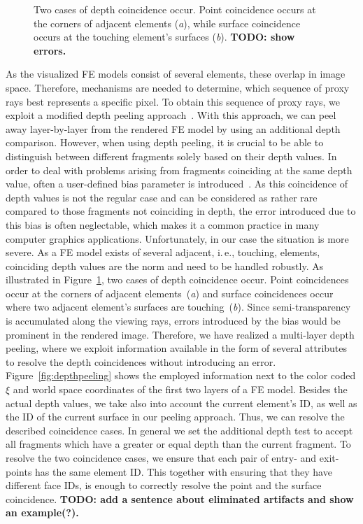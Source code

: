 \documentclass[review,journal]{vgtc}         %
\begin{document}
\begin{figure}[b]
  \centering 
  \caption{Two cases of depth coincidence occur. Point coincidence occurs at the corners of adjacent elements ({\it a}), while surface coincidence occurs at the touching element's surfaces ({\it b}). \textbf{TODO: show errors.}}
  \label{fig:depthcoincidence}
\end{figure}


As the visualized FE models consist of several elements, these overlap in image space. Therefore, mechanisms are needed to determine, which sequence of proxy rays best represents a specific pixel. To obtain this sequence of proxy rays, we exploit a modified depth peeling approach~\cite{DEPTHPEELING}. With this approach, we can peel away layer-by-layer from the rendered FE model by using an additional depth comparison. However, when using depth peeling, it is crucial to be able to distinguish between different fragments solely based on their depth values. In order to deal with problems arising from fragments coinciding at the same depth value, often a user-defined bias parameter is introduced~\cite{CASEVERITTPAPER}. As this coincidence of depth values is not the regular case and can be considered as rather rare compared to those fragments not coinciding in depth, the error introduced due to this bias is often neglectable, which makes it a common practice in many computer graphics applications. Unfortunately, in our case the situation is more severe. As a FE model exists of several adjacent, i.\,e., touching, elements, coinciding depth values are the norm and need to be handled robustly. As illustrated in Figure~\ref{fig:depthcoincidence}, two cases of depth coincidence occur. Point coincidences occur at the corners of adjacent elements~({\it a}) and surface coincidences occur where two adjacent element's surfaces are touching~({\it b}). Since semi-transparency is accumulated along the viewing rays, errors introduced by the bias would be prominent in the rendered image. Therefore, we have realized a multi-layer depth peeling, where we exploit information available in the form of several attributes to resolve the depth coincidences without introducing an error. Figure~\ref{fig:depthpeeling} shows the employed information next to the color coded $\xi$ and world space coordinates of the first two layers of a FE model. Besides the actual depth values, we take also into account the current element's ID, as well as the ID of the current surface in our peeling approach. Thus, we can resolve the described coincidence cases. In general we set the additional depth test to accept all fragments which have a greater or equal depth than the current fragment. To resolve the two coincidence cases, we ensure that each pair of entry- and exit-points has the same element ID. This together with ensuring that they have different face IDs, is enough to correctly resolve the point and the surface coincidence. \textbf{TODO: add a sentence about eliminated artifacts and show an example(?).}
\end{document}
